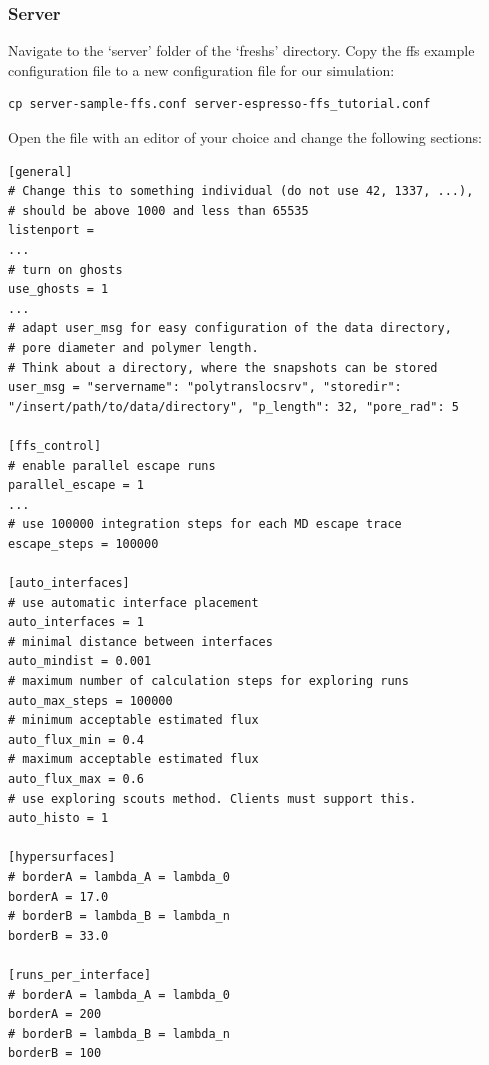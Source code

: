 \documentclass[a4paper,oneside]{article}
\newenvironment{mylisting}
{\begin{list}{}{\setlength{\leftmargin}{1em}}\item\scriptsize\bfseries}
{\end{list}}
\begin{document}
\subsubsection{Server}
Navigate to the `server' folder of the `freshs' directory. Copy the ffs example configuration file to a new configuration file for our simulation:
\begin{mylisting}
\begin{verbatim}
cp server-sample-ffs.conf server-espresso-ffs_tutorial.conf
\end{verbatim}
\end{mylisting}
Open the file with an editor of your choice and change the following sections:
\begin{mylisting}
\begin{verbatim}
[general]
# Change this to something individual (do not use 42, 1337, ...), 
# should be above 1000 and less than 65535
listenport = 
...
# turn on ghosts
use_ghosts = 1
...
# adapt user_msg for easy configuration of the data directory, 
# pore diameter and polymer length.
# Think about a directory, where the snapshots can be stored
user_msg = "servername": "polytranslocsrv", "storedir": 
"/insert/path/to/data/directory", "p_length": 32, "pore_rad": 5

[ffs_control]
# enable parallel escape runs
parallel_escape = 1
...
# use 100000 integration steps for each MD escape trace
escape_steps = 100000

[auto_interfaces]
# use automatic interface placement
auto_interfaces = 1
# minimal distance between interfaces
auto_mindist = 0.001
# maximum number of calculation steps for exploring runs
auto_max_steps = 100000
# minimum acceptable estimated flux
auto_flux_min = 0.4
# maximum acceptable estimated flux
auto_flux_max = 0.6
# use exploring scouts method. Clients must support this.
auto_histo = 1

[hypersurfaces]
# borderA = lambda_A = lambda_0
borderA = 17.0
# borderB = lambda_B = lambda_n
borderB = 33.0

[runs_per_interface]
# borderA = lambda_A = lambda_0
borderA = 200
# borderB = lambda_B = lambda_n
borderB = 100
\end{verbatim}
\end{mylisting}
\end{document}
